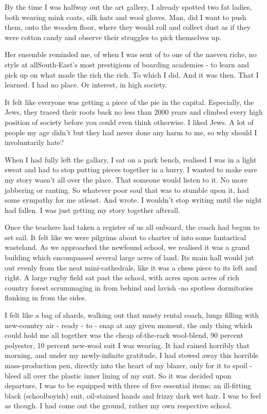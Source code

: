 \documentclass[19pt,openany]{book}
\begin{document}
By the time I was halfway out the art gallery,
I already spotted two fat ladies, both wearing
mink coats, silk hats and wool gloves. Man,
did I want to push them, onto the
wooden floor, where they would roll
and collect dust as if they were cotton candy
and observe their struggles to pick themselves up.

Her ensemble reminded me, of when I was
sent of to one of the  naeveu riche,
no style at allSouth-East's most
prestigious of boarding academies - to learn
and pick up on what made the rich the rich.
To which I did. And it was then. That
I learned. I had no place. Or interest, in
high society.

It felt like everyone was getting a piece of
the pie in the capital. Especially, the Jews,
they traced their roots back no less than 2000 years
and climbed every high position of society before
you could even think otherwise. I liked Jews. A lot
of people my age didn't but they had never done any
harm to me, so why should I involuntarily hate?

When I had fully left the gallary, I sat
on a park bench, realised I was
in a light sweat and had to stop
putting pieces together in a hurry.
I wanted to make sure my story wasn't all
over the place. That
someone would listen to it.
No more jabbering or ranting. So whatever poor soul
that was to stumble upon it,
had some sympathy for me atleast. And wrote.
I wouldn't stop writing until the night had fallen.
I was just getting my story together afterall.

Once the teachers had taken a register of
us all onboard, the coach had begun
to set sail. It felt like we were pilgrims
about to charter of
into some fantastical wasteland.
As we approached the newfound school,
we realised it was a grand building
which encompassed several large acres
of land. Its main hall would jut out evenly
from the neat mini-cathedrals,
like it was a chess piece to its left
and right. A large rugby field sat past the school,
with acres upon acres of rich country forest
scrummaging in from behind and lavish -no spotless
dormitories flanking in from the sides.

I felt like a bag of shards, walking
out that musty rental coach, lungs filling
with new-country air - ready - to - snap
at any given moment, the only thing
which could hold me all together
was the cheap of-the-rack wool-blend,
90 percent polyester, 10 percent new-wool suit
I was wearing.
It had rained horribly that morning, and under my
newly-infinite gratitude, I had stowed away this
horrible mass-production
pen, directly into the heart of my blazer, only for it
to spoil - bleed all over the plastic inner lining
of my suit. So it was decided upon departure,
I was to be equipped with three of five essential
items; an ill-fitting black (schoolboyish) suit,
oil-stained hands and frizzy dark wet hair. I
was to feel as though. I had come out the ground,
rather my own respective school.
\end{document}
